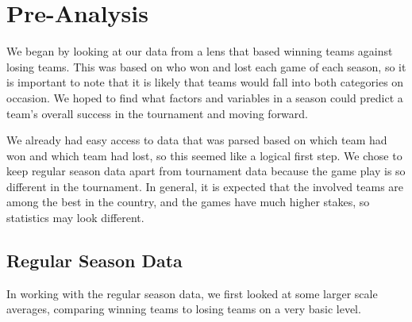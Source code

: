 \documentclass[]{scrartcl}
\begin{document}
\section*{Pre-Analysis}
We began by looking at our data from a lens that based winning teams against losing teams. This was based on who won and lost each game of each season, so it is important to note that it is likely that teams would fall into both categories on occasion. We hoped to find what factors and variables in a season could predict a team's overall success in the tournament and moving forward.

We already had easy access to data that was parsed based on which team had won and which team had lost, so this seemed like a logical first step. We chose to keep regular season data apart from tournament data because the game play is so different in the tournament. In general, it is expected that the involved teams are among the best in the country, and the games have much higher stakes, so statistics may look different.
\subsection*{Regular Season Data}
In working with the regular season data, we first looked at some larger scale averages, comparing winning teams to losing teams on a very basic level.
\end{document}
